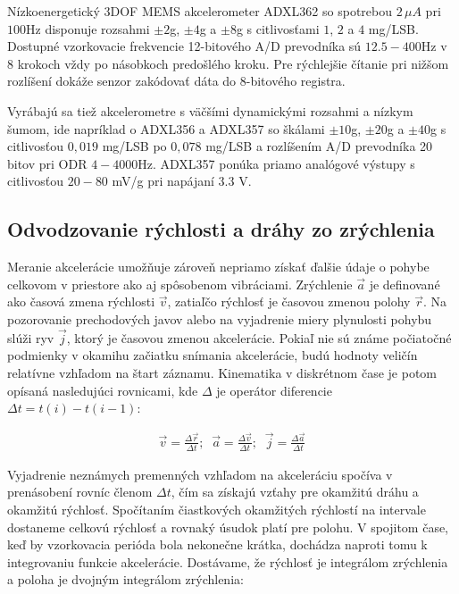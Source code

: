 Nízkoenergetický 3DOF MEMS akcelerometer ADXL362 \cite{adxl362} so spotrebou $2\,\mu A$ pri $100$Hz disponuje
rozsahmi $\pm2$g, $\pm4$g a $\pm8$g s citlivosťami $1$, $2$ a $4$ mg/LSB. Dostupné vzorkovacie frekvencie 12-bitového A/D prevodníka sú
$12.5 - 400$Hz v 8 krokoch vždy po násobkoch predošlého kroku. Pre rýchlejšie čítanie pri nižšom rozlíšení dokáže senzor zakódovať dáta
do 8-bitového registra.

Vyrábajú sa tiež akcelerometre s väčšími dynamickými rozsahmi a nízkym šumom, ide napríklad o ADXL356 a ADXL357 \cite{adxl357} so
škálami $\pm 10$g, $\pm 20$g a $\pm 40$g s citlivosťou $0,019$ mg/LSB po $0,078$ mg/LSB a rozlíšením A/D prevodníka 20 bitov pri
ODR $4 - 4000$Hz. ADXL357 ponúka priamo analógové výstupy s citlivosťou $20 - 80$ mV/g pri napájaní $3.3$ V.

\subsection{Odvodzovanie rýchlosti a dráhy zo zrýchlenia}
Meranie akcelerácie umožňuje zároveň nepriamo získať ďalšie údaje o pohybe celkovom v priestore ako aj spôsobenom vibráciami.
Zrýchlenie $\vec{a}$ je definované ako časová zmena rýchlosti $\vec{v}$, zatiaľčo rýchlosť je časovou zmenou polohy $\vec{r}$. Na
pozorovanie prechodových javov alebo na vyjadrenie miery plynulosti pohybu slúži ryv $\vec{j}$, ktorý je časovou zmenou akcelerácie.
Pokiaľ nie sú známe počiatočné podmienky v okamihu začiatku snímania akcelerácie, budú hodnoty veličín relatívne vzhľadom na
štart záznamu. Kinematika v diskrétnom čase je potom opísaná nasledujúci rovnicami, kde $\Delta$ je operátor diferencie
$\Delta t = t(i) - t(i-1)$:

\begin{ceqn}\begin{align}
   \vec{v} = \frac{\Delta \vec{r}}{\Delta t}; \;\;
   \vec{a} = \frac{\Delta \vec{v}}{\Delta t}; \;\;
   \vec{j} = \frac{\Delta \vec{a}}{\Delta t}
\end{align}\end{ceqn}

Vyjadrenie neznámych premenných vzhľadom na akceleráciu spočíva v prenásobení rovníc členom $\Delta t$, čím sa získajú
vzťahy pre okamžitú dráhu a okamžitú rýchlosť. Spočítaním čiastkových okamžitých rýchlostí na intervale dostaneme celkovú rýchlosť a
rovnaký úsudok platí pre polohu. V spojitom čase, keď by vzorkovacia perióda bola nekonečne krátka, dochádza naproti tomu k
integrovaniu funkcie akcelerácie. Dostávame, že rýchlosť je integrálom zrýchlenia a poloha je dvojným integrálom zrýchlenia:

